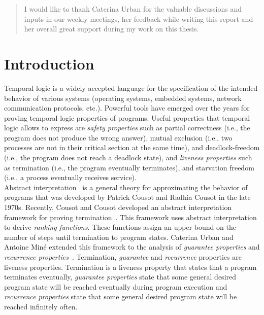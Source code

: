\documentclass[11pt,a4paper,titlepage]{article}
\theoremstyle{definition}
\begin{document}
\renewcommand{\abstractname}{Acknowledgements}
\begin{abstract}
    I would like to thank Caterina Urban for the valuable discussions and inputs in our weekly meetings, her feedback while writing this report
    and her overall great support during my work on this thesis. 
\end{abstract}

\tableofcontents
\clearpage

\section{Introduction}
 
Temporal logic is a widely accepted language for the specification of the intended behavior of various systems 
(operating systems, embedded systems, network communication protocols, etc.). 
Powerful tools have emerged over the years for proving temporal logic properties of programs.
Useful properties that temporal logic allows to express are \emph{safety properties} such as partial correctness (i.e., the program does not produce the wrong answer), 
mutual exclusion (i.e., two processes are not in their critical section at the same time), 
and deadlock-freedom (i.e., the program does not reach a deadlock state), 
and \emph{liveness properties} such as termination (i.e., the program eventually terminates), 
and starvation freedom (i.e., a process eventually receives service).\\

Abstract interpretation~\cite{Cousot:1977:AIU:512950.512973} is a general theory for approximating the behavior of programs that was 
developed by Patrick Cousot and Radhia Cousot in the late 1970s. 
Recently, Cousot and Cousot developed an abstract interpretation framework for proving termination~\cite{CousotCousot-POPL12}. 
This framework uses abstract interpretation to derive \emph{ranking functions}. These functions assign an upper bound on the number of steps until termination
to program states. Caterina Urban and Antoine Miné extended this framework to the analysis of 
\emph{guarantee properties} and \emph{recurrence properties}~\cite{UrbanM-VMCAI15}.
Termination, \emph{guarantee} and \emph{recurrence} properties are liveness properties. 
Termination is a liveness property that states that a program terminates eventually, 
\emph{guarantee properties} state that some general desired program state will be reached eventually during program execution and 
\emph{recurrence properties} state that some general desired program state will be reached infinitely often.\\
\end{document}
